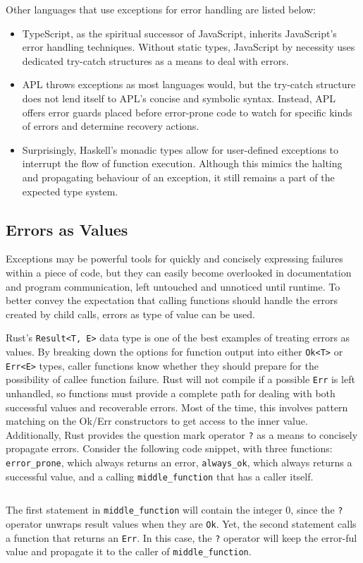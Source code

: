 \documentclass{article}
\begin{document}
Other languages that use exceptions for error handling are listed below:
\begin{itemize}
    \item TypeScript, as the spiritual successor of JavaScript, inherits JavaScript's
    error handling techniques. Without static types, JavaScript by necessity uses
    dedicated try-catch structures as a means to deal with errors.
    \item APL throws exceptions as most languages would, but the try-catch structure does not lend itself to
    APL's concise and symbolic syntax. Instead, APL offers error guards placed before error-prone code
    to watch for specific kinds of errors and determine recovery actions.
    \item Surprisingly, Haskell's monadic types allow for user-defined exceptions to interrupt the flow of function execution.
    Although this mimics the halting and propagating behaviour of an exception,
    it still remains a part of the expected type system.
\end{itemize}

\subsection{Errors as Values}

Exceptions may be powerful tools for quickly and concisely expressing failures within a piece of code, but they can
easily become overlooked in documentation and program communication, left untouched and unnoticed until runtime.
To better convey the expectation that calling functions should handle the errors created by child calls,
errors as type of value can be used.

Rust's \texttt{Result<T, E>} data type is one of the best examples of treating errors as values.
By breaking down the options for function output into either \texttt{Ok<T>} or \texttt{Err<E>}
types, caller functions know whether they should prepare for the possibility of callee function failure.
Rust will not compile if a possible \texttt{Err} is left unhandled,
so functions must provide a complete path for dealing with both successful values and recoverable errors.
Most of the time, this involves pattern matching on the Ok/Err constructors to get access to the inner value.
Additionally, Rust provides the question mark operator \texttt{?} as a means to concisely propagate errors.
Consider the following code snippet, with three functions: \texttt{error\_prone}, which always returns an error,
\texttt{always\_ok}, which always returns a successful value, and a calling \texttt{middle\_function}
that has a caller itself.
\inputminted{rust}{linked_list/err.rs}
The first statement in \texttt{middle\_function} will contain the integer 0, since the \texttt{?} operator
unwraps result values when they are \texttt{Ok}. Yet, the second statement calls a function that returns an \texttt{Err}.
In this case, the \texttt{?} operator will keep the error-ful value and propagate it to the caller of \texttt{middle\_function}.
\end{document}
